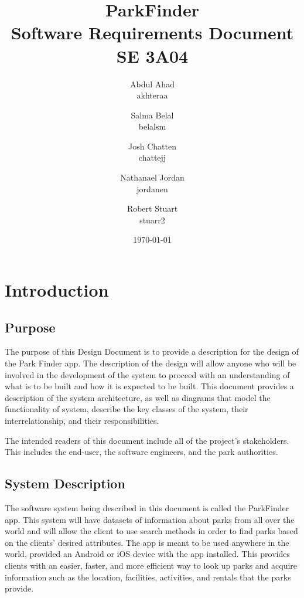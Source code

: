 \documentclass[titlepage,12pt]{article}
\title{ParkFinder\\Software Requirements Document\\SE 3A04}
\author{Abdul Ahad \\ akhteraa \and Salma Belal \\ belalsm \and Josh Chatten \\ chattejj \and
Nathanael Jordan \\ jordanen \and Robert Stuart \\ stuarr2}
\date{\today}
\begin{document}
\maketitle	
\thispagestyle{empty}
\clearpage
\setcounter{tocdepth}{2}%
\tableofcontents
\clearpage

\section{Introduction}
\label{sec:introduction}


\subsection{Purpose}
\label{sub:purpose}

The purpose of this Design Document is to provide a description for the design of the Park Finder
app. The description of the design will allow anyone who will be involved in the development of the
system to proceed with an understanding of what is to be built and how it is expected to be built.
This document provides a description of the system architecture, as well as diagrams that model the
functionality of system, describe the key classes of the system, their interrelationship, and their
responsibilities.

The intended readers of this document include all of the project's stakeholders. This includes the
end-user, the software engineers, and the park authorities.


\subsection{System Description}
\label{sub:system_description}

The software system being described in this document is called the ParkFinder app. This system will
have datasets of information about parks from all over the world and will allow the client to use
search methods in order to find parks based on the clients' desired attributes. The app is meant to
be used anywhere in the world, provided an Android or iOS device with the app installed. This
provides clients with an easier, faster, and more efficient way to look up parks and acquire
information such as the location, facilities, activities, and rentals that the parks provide.
\end{document}
